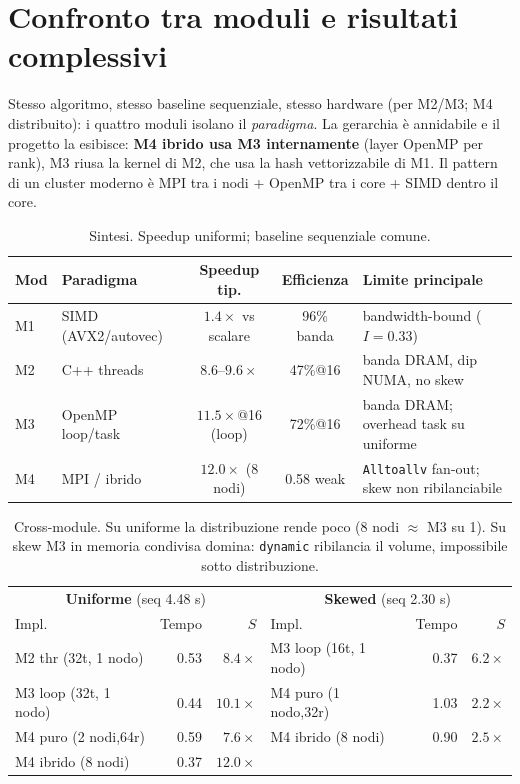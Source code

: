 \documentclass[11pt,a4paper]{article}
\begin{document}
\section{Confronto tra moduli e risultati complessivi}

Stesso algoritmo, stesso baseline sequenziale, stesso hardware (per M2/M3; M4 distribuito): i quattro moduli isolano il \emph{paradigma}. La gerarchia è annidabile e il progetto la esibisce: \textbf{M4 ibrido usa M3 internamente} (layer OpenMP per rank), M3 riusa la kernel di M2, che usa la hash vettorizzabile di M1. Il pattern di un cluster moderno è MPI tra i nodi + OpenMP tra i core + SIMD dentro il core.

\begin{table}[H]
\centering\footnotesize
\setlength{\tabcolsep}{4pt}
\begin{tabularx}{\textwidth}{@{}llccX@{}}
\toprule
\textbf{Mod} & \textbf{Paradigma} & \textbf{Speedup tip.} & \textbf{Efficienza} & \textbf{Limite principale} \\
\midrule
M1 & SIMD (AVX2/autovec) & $1.4\times$ vs scalare & 96\% banda & bandwidth-bound ($I{=}0.33$) \\
M2 & C++ threads & $8.6$--$9.6\times$ & 47\%@16 & banda DRAM, dip NUMA, no skew \\
M3 & OpenMP loop/task & $11.5\times$@16 (loop) & 72\%@16 & banda DRAM; overhead task su uniforme \\
M4 & MPI / ibrido & $12.0\times$ (8 nodi) & 0.58 weak & \texttt{Alltoallv} fan-out; skew non ribilanciabile \\
\bottomrule
\end{tabularx}
\caption{Sintesi. Speedup uniformi; baseline sequenziale comune.}
\end{table}

\begin{table}[H]
\centering\small
\begin{tabular}{@{}lrr|lrr@{}}
\toprule
\multicolumn{3}{c|}{\textbf{Uniforme} (seq 4.48 s)} & \multicolumn{3}{c}{\textbf{Skewed} (seq 2.30 s)} \\
Impl. & Tempo & $S$ & Impl. & Tempo & $S$ \\
\midrule
M2 thr (32t, 1 nodo)   & 0.53 & $8.4\times$  & M3 loop (16t, 1 nodo) & 0.37 & $6.2\times$ \\
M3 loop (32t, 1 nodo)  & 0.44 & $10.1\times$ & M4 puro (1 nodo,32r)  & 1.03 & $2.2\times$ \\
M4 puro (2 nodi,64r)   & 0.59 & $7.6\times$  & M4 ibrido (8 nodi)    & 0.90 & $2.5\times$ \\
M4 ibrido (8 nodi)     & 0.37 & $12.0\times$ &                       &      &            \\
\bottomrule
\end{tabular}
\caption{Cross-module. Su uniforme la distribuzione rende poco (8 nodi $\approx$ M3 su 1). Su skew M3 in memoria condivisa domina: \texttt{dynamic} ribilancia il volume, impossibile sotto distribuzione.}
\end{table}
\end{document}
